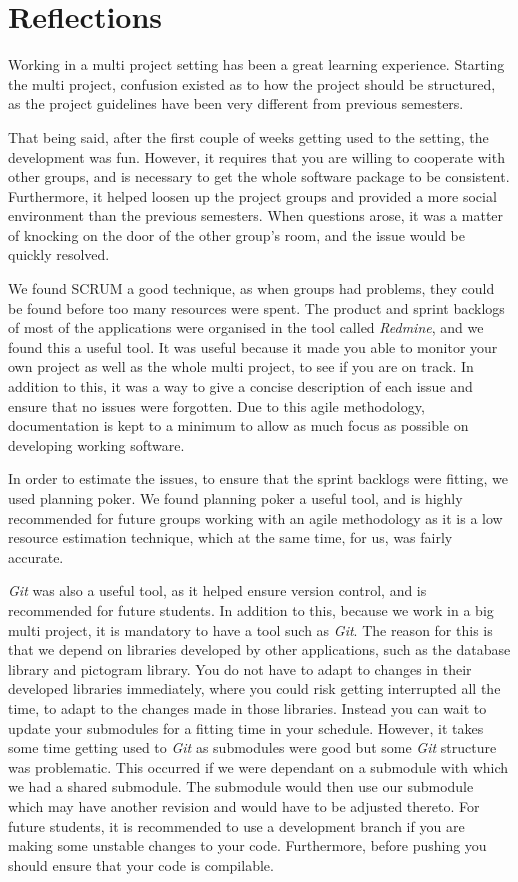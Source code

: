 \chapter{Reflections}
Working in a multi project setting has been a great learning experience.
Starting the multi project, confusion existed as to how the project should be structured, as the project guidelines have been very different from previous semesters.

That being said, after the first couple of weeks getting used to the setting, the development was fun.
However, it requires that you are willing to cooperate with other groups, and is necessary to get the whole software package to be consistent.
Furthermore, it helped loosen up the project groups and provided a more social environment than the previous semesters.
When questions arose, it was a matter of knocking on the door of the other group's room, and the issue would be quickly resolved.

We found SCRUM a good technique, as when groups had problems, they could be found before too many resources were spent.
The product and sprint backlogs of most of the applications were organised in the tool called \textit{Redmine}, and we found this a useful tool.
It was useful because it made you able to monitor your own project as well as the whole multi project, to see if you are on track.
In addition to this, it was a way to give a concise description of each issue and ensure that no issues were forgotten.
Due to this agile methodology, documentation is kept to a minimum to allow as much focus as possible on developing working software.

In order to estimate the issues, to ensure that the sprint backlogs were fitting, we used planning poker.
We found planning poker a useful tool, and is highly recommended for future groups working with an agile methodology as it is a low resource estimation technique, which at the same time, for us, was fairly accurate.

\textit{Git} was also a useful tool, as it helped ensure version control, and is recommended for future students.
In addition to this, because we work in a big multi project, it is mandatory to have a tool such as \textit{Git}.
The reason for this is that we depend on libraries developed by other applications, such as the database library and pictogram library.
You do not have to adapt to changes in their developed libraries immediately, where you could risk getting interrupted all the time, to adapt to the changes made in those libraries. 
Instead you can wait to update your submodules for a fitting time in your schedule.
However, it takes some time getting used to \textit{Git} as submodules were good but some \textit{Git} structure was problematic.
This occurred if we were dependant on a submodule with which we had a shared submodule.
The submodule would then use our submodule which may have another revision and would have to be adjusted thereto.
For future students, it is recommended to use a development branch if you are making some unstable changes to your code.
Furthermore, before pushing you should ensure that your code is compilable.

